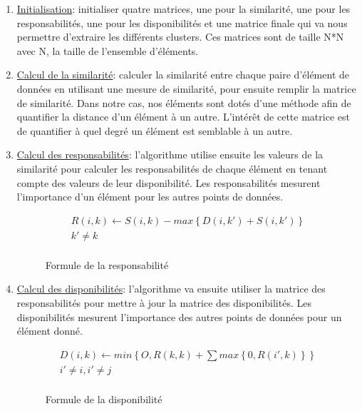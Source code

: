 \begin{enumerate}

    \item \underline{Initialisation}: initialiser quatre matrices, une pour la similarité, une pour les responsabilités, une pour les disponibilités et une matrice finale qui va nous permettre d'extraire les différents clusters. Ces matrices sont de taille N*N avec N, la taille de l'ensemble d'éléments.
    
    \item \underline{Calcul de la similarité}: calculer la similarité entre chaque paire d'élément de données en utilisant une mesure de similarité, pour ensuite remplir la matrice de similarité. Dans notre cas, nos éléments sont dotés d'une méthode afin de quantifier la distance d'un élément à un autre. L'intérêt de cette matrice est de quantifier à quel degré un élément est semblable à un autre.
    
    \item \underline{Calcul des responsabilités}: l'algorithme utilise ensuite les valeurs de la similarité pour calculer les responsabilités de chaque élément en tenant compte des valeurs de leur disponibilité. Les responsabilités mesurent l'importance d'un élément pour les autres points de données.\\ 
    \begin{figure}[ht]
        \centering
        \begin{equation}
            \begin{aligned}
                R\left ( i,k \right )\leftarrow S\left ( i,k \right ) - max\left \{ D\left ( i,k' \right ) + S\left ( i,k' \right ) \right \}\\
                k'\neq k\\
            \end{aligned}
        \end{equation}
        \caption{Formule de la responsabilité}
        \label{fig:responsibility}
    \end{figure}

    \item \underline{Calcul des disponibilités}: l'algorithme va ensuite utiliser la matrice des responsabilités pour mettre à jour la matrice des disponibilités. Les disponibilités mesurent l'importance des autres points de données pour un élément donné.
    \begin{figure}[ht]
        \centering
        \begin{equation}
            \begin{aligned}
                D\left ( i,k \right )\leftarrow min\left \{ O,R\left ( k,k \right ) + \sum max\left \{ 0,R\left ( i',k \right ) \right \} \right \}\\
                i' \neq i, i' \neq j\\
            \end{aligned}
        \end{equation}
        \caption{Formule de la disponibilité}
        \label{fig:avariability}
    \end{figure}


\end{enumerate}
